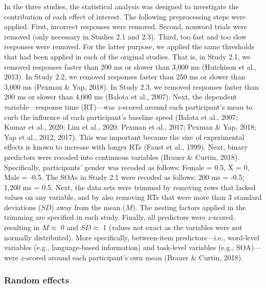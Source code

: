 \documentclass[
  12pt,
  man,floatsintext]{apa7}
\begin{document}
In the three studies, the statistical analysis was designed to investigate the contribution of each effect of interest. The following preprocessing steps were applied. First, incorrect responses were removed. Second, nonword trials were removed (only necessary in Studies 2.1 and 2.3). Third, too fast and too slow responses were removed. For the latter purpose, we applied the same thresholds that had been applied in each of the original studies. That is, in Study 2.1, we removed responses faster than 200 ms or slower than 3,000 ms (Hutchison et al., 2013). In Study 2.2, we removed responses faster than 250 ms or slower than 3,000 ms (Pexman \& Yap, 2018). In Study 2.3, we removed responses faster than 200 ms or slower than 4,000 ms (Balota et al., 2007). Next, the dependent variable---response time (RT)---was \(z\)-scored around each participant's mean to curb the influence of each participant's baseline speed (Balota et al., 2007; Kumar et al., 2020; Lim et al., 2020; Pexman et al., 2017; Pexman \& Yap, 2018; Yap et al., 2012, 2017). This was important because the size of experimental effects is known to increase with longer RTs (Faust et al., 1999). Next, binary predictors were recoded into continuous variables (Brauer \& Curtin, 2018). Specifically, participants' gender was recoded as follows: Female = 0.5, X = 0, Male = -0.5. The SOAs in Study 2.1 were recoded as follows: 200 ms = -0.5; 1,200 ms = 0.5. Next, the data sets were trimmed by removing rows that lacked values on any variable, and by also removing RTs that were more than 3 standard deviations (\(SD\)) away from the mean (\(M\)). The nesting factors applied in the trimming are specified in each study. Finally, all predictors were \(z\)-scored, resulting in \(M \approx\) 0 and \(SD \approx\) 1 (values not exact as the variables were not normally distributed). More specifically, between-item predictors---i.e., word-level variables (e.g., language-based information) and task-level variables (e.g., SOA)---were \(z\)-scored around each participant's own mean (Brauer \& Curtin, 2018).

\hypertarget{random-effects}{%
\subsubsection{Random effects}\label{random-effects}}
\end{document}

